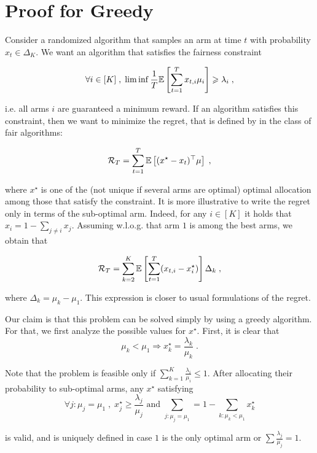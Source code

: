 \section{Proof for Greedy}

Consider a randomized algorithm that samples an arm at time $t$ with probability $x_t \in \Delta_K$. We want an algorithm that satisfies the fairness constraint

\[\forall i \in [K]\;, \; \liminf \frac{1}{T} \mathbb{E}\left[\sum_{t=1}^T x_{t,i} \mu_i \right] \geqslant \lambda_i \;,\]

i.e. all arms $i$ are guaranteed a minimum reward. If an algorithm satisfies this constraint, then we want to minimize the regret, that is defined by in the class of fair algorithms:

\[ \mathcal{R}_T = \sum_{t=1}^T \mathbb{E}\left[(x^\star - x_t)^\top\mu \right]\;, \]

where $x^\star$ is one of the (not unique if several arms are optimal) optimal allocation among those that satisfy the constraint. It is more illustrative to write the regret only in terms of the sub-optimal arm. Indeed, for any $i\in [K]$ it holds that $x_i = 1-\sum_{j \neq i } x_j$. Assuming w.l.o.g. that arm $1$ is among the best arms, we obtain that 

\begin{equation}\label{eq::regret}\mathcal{R}_T =  \sum_{k=2}^K \mathbb{E}\left[\sum_{t=1}^T (x_{t, i} - x^\star_i)\right] \Delta_k \;, \end{equation}

where $\Delta_k = \mu_k - \mu_1$. This expression is closer to usual formulations of the regret.

Our claim is that this problem can be solved simply by using a greedy algorithm. For that, we first analyze the possible values for $x^\star$. First, it is clear that \[ \mu_k < \mu_1 \Rightarrow x_k^\star = \frac{\lambda_k}{\mu_k} \;. \]

Note that the problem is feasible only if $\sum_{k=1}^{K}\frac{\lambda_i}{\mu_i}\leq1$. After allocating their probability to sub-optimal arms, any $x^\star$ satisfying \[ \forall j: \mu_j =\mu_1\;, \; x_j^\star \geq \frac{\lambda_j}{\mu_j} \text{ and } \sum_{j: \mu_j=\mu_1} = 1 -\sum_{k: \mu_k<\mu_1} x_k^\star \]

is valid, and is uniquely defined in case $1$ is the only optimal arm or $\sum \frac{\lambda_j}{\mu_j}=1$.

